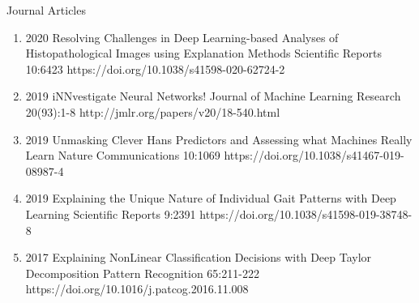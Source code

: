 \documentclass[10pt,a4paper]{article} %
\begin{document}
\headedsection %
{Journal Articles}{ }
{
\begin{enumerate}

    \item[] 
                        {2020}
                        {Resolving Challenges in Deep Learning-based Analyses of Histopathological Images using Explanation Methods}
                        {Scientific Reports}
                        {10:6423}
                        {https://doi.org/10.1038/s41598-020-62724-2}

    \item[] 
                        {2019}
                        {iNNvestigate Neural Networks!}
                        {Journal of Machine Learning Research}
                        {20(93):1-8}
                        {http://jmlr.org/papers/v20/18-540.html}

    \item[] 
                        {2019}
                        {Unmasking Clever Hans Predictors and Assessing what Machines Really Learn}
                        {Nature Communications}
                        {10:1069}
                        {https://doi.org/10.1038/s41467-019-08987-4}

    \item[] 
                        {2019}
                        {Explaining the Unique Nature of Individual Gait Patterns with Deep Learning}
                        {Scientific Reports}
                        {9:2391}
                        {https://doi.org/10.1038/s41598-019-38748-8}

    \item[] 
                        {2017}
                        {Explaining NonLinear Classification Decisions with Deep Taylor Decomposition}
                        {Pattern Recognition}
                        {65:211-222}
                        {https://doi.org/10.1016/j.patcog.2016.11.008}


\end{enumerate}}
\end{document}
